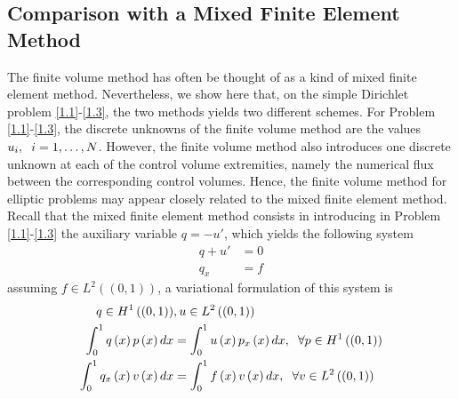 \documentclass[a4paper]{article}
\numberwithin{equation}{section}
\begin{document}
\subsection{Comparison with a Mixed Finite Element Method}
The finite volume method has often be thought of as a kind of mixed finite element method. Nevertheless, we show here that, on the simple Dirichlet problem \eqref{1.1}-\eqref{1.3}, the two methods yields two different schemes. For Problem \eqref{1.1}-\eqref{1.3}, the discrete unknowns of the finite volume method are the values $u_i,\hspace{0.2cm}i=1,\ldots,N$. However, the finite volume method also introduces one discrete unknown at each of the control volume extremities, namely the numerical flux between the corresponding control volumes. Hence, the finite volume method for elliptic problems may appear closely related to the mixed finite element method. Recall that the mixed finite element method consists in introducing in Problem \eqref{1.1}-\eqref{1.3} the auxiliary variable $q=-u'$, which yields the following system
\begin{align}
q + {u'} &= 0\\
{q_x} &= f
\end{align}
assuming $f\in L^2\left(\left(0,1\right)\right)$, a variational formulation of this system is
\begin{align}
q \in {H^1}\left( {\left( {0,1} \right)} \right)&,u \in {L^2}\left( {\left( {0,1} \right)} \right)\\
\int_0^1 {q\left( x \right)p\left( x \right)dx}  &= \int_0^1 {u\left( x \right){p_x}\left( x \right)dx} ,\hspace{0.2cm}\forall p \in {H^1}\left( {\left( {0,1} \right)} \right)\label{1.139}\\
\int_0^1 {{q_x}\left( x \right)v\left( x \right)dx}  &= \int_0^1 {f\left( x \right)v\left( x \right)dx} ,\hspace{0.2cm}\forall v \in {L^2}\left( {\left( {0,1} \right)} \right) \label{1.140}
\end{align}
\end{document}
